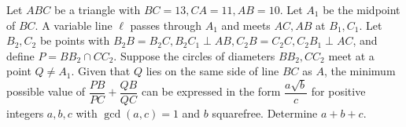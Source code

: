 Let $ABC$ be a triangle with $BC=13, CA=11, AB=10$. Let $A_1$ be the midpoint of $BC$. A variable line $\ell$ passes through $A_1$ and meets $AC,AB$ at $B_1,C_1$. Let $B_2,C_2$ be points with $B_2B=B_2C, B_2C_1\perp AB, C_2B=C_2C, C_2B_1 \perp AC$, and define $P=BB_2\cap CC_2$. Suppose the circles of diameters $BB_2, CC_2$ meet at a point $Q\neq A_1$. Given that $Q$ lies on the same side of line $BC$ as $A$, the minimum possible value of $\dfrac{PB}{PC}+\dfrac{QB}{QC}$ can be expressed in the form $\dfrac{a\sqrt{b}}{c}$ for positive integers $a,b,c$ with $\gcd (a,c)=1$ and $b$ squarefree. Determine $a+b+c$.
